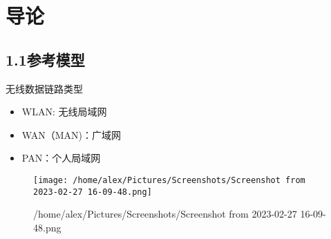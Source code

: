 \documentclass{ctexart}
\begin{document}
\section{导论}
\subsection{1.1参考模型}
无线数据链路类型
\begin{itemize}
	\item WLAN: 无线局域网
	\item WAN（MAN)：广域网
	\item PAN：个人局域网
\end{itemize}
\begin{figure}[htpb]
	\centering
	\texttt{[image: /home/alex/Pictures/Screenshots/Screenshot from 2023-02-27 16-09-48.png]}
	\caption{/home/alex/Pictures/Screenshots/Screenshot from 2023-02-27 16-09-48.png}
	\label{fig:7 layers}

\end{figure}
\end{document}
